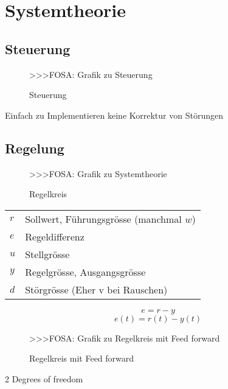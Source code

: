 



\section{Systemtheorie}

\subsection{Steuerung}
\begin{figure}[h!]
    \centering
    >>>FOSA: Grafik zu Steuerung
    \caption{Steuerung}
    \label{fig:control}
\end{figure}
Einfach zu Implementieren
keine Korrektur von Störungen

\subsection{Regelung}
\begin{figure}[h!]
    \centering
    >>>FOSA: Grafik zu Systemtheorie
    \caption{Regelkreis}
    \label{fig:regsystem}
\end{figure}
\begin{tabular}{@{}ll}
$r$ & Sollwert, Führungsgrösse (manchmal $w$) \\
$e$ & Regeldifferenz \\
$u$ & Stellgrösse \\
$y$ & Regelgrösse, Ausgangsgrösse \\
$d$ & Störgrösse (Eher v bei Rauschen)
\end{tabular}
\[ \boxed{e = r - y} \]
\[ \boxed{e(t) = r(t) - y(t)} \]
\begin{figure}[h!]
    \centering
    >>>FOSA: Grafik zu Regelkreis mit Feed forward
    \caption{Regelkreis mit Feed forward}
    \label{fig:feedforward}
\end{figure}
2 Degrees of freedom

